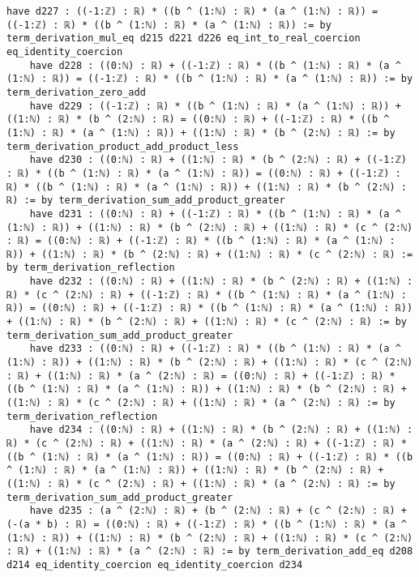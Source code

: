 \documentclass{article}
\begin{document}
\begin{tcolorbox}[colback=white!10, width=\linewidth]
\begin{lstlisting}[language=Lean4]
    have d227 : ((-1:ℤ) : ℝ) * ((b ^ (1:ℕ) : ℝ) * (a ^ (1:ℕ) : ℝ)) = ((-1:ℤ) : ℝ) * ((b ^ (1:ℕ) : ℝ) * (a ^ (1:ℕ) : ℝ)) := by term_derivation_mul_eq d215 d221 d226 eq_int_to_real_coercion eq_identity_coercion
    have d228 : ((0:ℕ) : ℝ) + ((-1:ℤ) : ℝ) * ((b ^ (1:ℕ) : ℝ) * (a ^ (1:ℕ) : ℝ)) = ((-1:ℤ) : ℝ) * ((b ^ (1:ℕ) : ℝ) * (a ^ (1:ℕ) : ℝ)) := by term_derivation_zero_add
    have d229 : ((-1:ℤ) : ℝ) * ((b ^ (1:ℕ) : ℝ) * (a ^ (1:ℕ) : ℝ)) + ((1:ℕ) : ℝ) * (b ^ (2:ℕ) : ℝ) = ((0:ℕ) : ℝ) + ((-1:ℤ) : ℝ) * ((b ^ (1:ℕ) : ℝ) * (a ^ (1:ℕ) : ℝ)) + ((1:ℕ) : ℝ) * (b ^ (2:ℕ) : ℝ) := by term_derivation_product_add_product_less
    have d230 : ((0:ℕ) : ℝ) + ((1:ℕ) : ℝ) * (b ^ (2:ℕ) : ℝ) + ((-1:ℤ) : ℝ) * ((b ^ (1:ℕ) : ℝ) * (a ^ (1:ℕ) : ℝ)) = ((0:ℕ) : ℝ) + ((-1:ℤ) : ℝ) * ((b ^ (1:ℕ) : ℝ) * (a ^ (1:ℕ) : ℝ)) + ((1:ℕ) : ℝ) * (b ^ (2:ℕ) : ℝ) := by term_derivation_sum_add_product_greater
    have d231 : ((0:ℕ) : ℝ) + ((-1:ℤ) : ℝ) * ((b ^ (1:ℕ) : ℝ) * (a ^ (1:ℕ) : ℝ)) + ((1:ℕ) : ℝ) * (b ^ (2:ℕ) : ℝ) + ((1:ℕ) : ℝ) * (c ^ (2:ℕ) : ℝ) = ((0:ℕ) : ℝ) + ((-1:ℤ) : ℝ) * ((b ^ (1:ℕ) : ℝ) * (a ^ (1:ℕ) : ℝ)) + ((1:ℕ) : ℝ) * (b ^ (2:ℕ) : ℝ) + ((1:ℕ) : ℝ) * (c ^ (2:ℕ) : ℝ) := by term_derivation_reflection
    have d232 : ((0:ℕ) : ℝ) + ((1:ℕ) : ℝ) * (b ^ (2:ℕ) : ℝ) + ((1:ℕ) : ℝ) * (c ^ (2:ℕ) : ℝ) + ((-1:ℤ) : ℝ) * ((b ^ (1:ℕ) : ℝ) * (a ^ (1:ℕ) : ℝ)) = ((0:ℕ) : ℝ) + ((-1:ℤ) : ℝ) * ((b ^ (1:ℕ) : ℝ) * (a ^ (1:ℕ) : ℝ)) + ((1:ℕ) : ℝ) * (b ^ (2:ℕ) : ℝ) + ((1:ℕ) : ℝ) * (c ^ (2:ℕ) : ℝ) := by term_derivation_sum_add_product_greater
    have d233 : ((0:ℕ) : ℝ) + ((-1:ℤ) : ℝ) * ((b ^ (1:ℕ) : ℝ) * (a ^ (1:ℕ) : ℝ)) + ((1:ℕ) : ℝ) * (b ^ (2:ℕ) : ℝ) + ((1:ℕ) : ℝ) * (c ^ (2:ℕ) : ℝ) + ((1:ℕ) : ℝ) * (a ^ (2:ℕ) : ℝ) = ((0:ℕ) : ℝ) + ((-1:ℤ) : ℝ) * ((b ^ (1:ℕ) : ℝ) * (a ^ (1:ℕ) : ℝ)) + ((1:ℕ) : ℝ) * (b ^ (2:ℕ) : ℝ) + ((1:ℕ) : ℝ) * (c ^ (2:ℕ) : ℝ) + ((1:ℕ) : ℝ) * (a ^ (2:ℕ) : ℝ) := by term_derivation_reflection
    have d234 : ((0:ℕ) : ℝ) + ((1:ℕ) : ℝ) * (b ^ (2:ℕ) : ℝ) + ((1:ℕ) : ℝ) * (c ^ (2:ℕ) : ℝ) + ((1:ℕ) : ℝ) * (a ^ (2:ℕ) : ℝ) + ((-1:ℤ) : ℝ) * ((b ^ (1:ℕ) : ℝ) * (a ^ (1:ℕ) : ℝ)) = ((0:ℕ) : ℝ) + ((-1:ℤ) : ℝ) * ((b ^ (1:ℕ) : ℝ) * (a ^ (1:ℕ) : ℝ)) + ((1:ℕ) : ℝ) * (b ^ (2:ℕ) : ℝ) + ((1:ℕ) : ℝ) * (c ^ (2:ℕ) : ℝ) + ((1:ℕ) : ℝ) * (a ^ (2:ℕ) : ℝ) := by term_derivation_sum_add_product_greater
    have d235 : (a ^ (2:ℕ) : ℝ) + (b ^ (2:ℕ) : ℝ) + (c ^ (2:ℕ) : ℝ) + (-(a * b) : ℝ) = ((0:ℕ) : ℝ) + ((-1:ℤ) : ℝ) * ((b ^ (1:ℕ) : ℝ) * (a ^ (1:ℕ) : ℝ)) + ((1:ℕ) : ℝ) * (b ^ (2:ℕ) : ℝ) + ((1:ℕ) : ℝ) * (c ^ (2:ℕ) : ℝ) + ((1:ℕ) : ℝ) * (a ^ (2:ℕ) : ℝ) := by term_derivation_add_eq d208 d214 eq_identity_coercion eq_identity_coercion d234

\end{lstlisting}
\end{tcolorbox}
\end{document}
